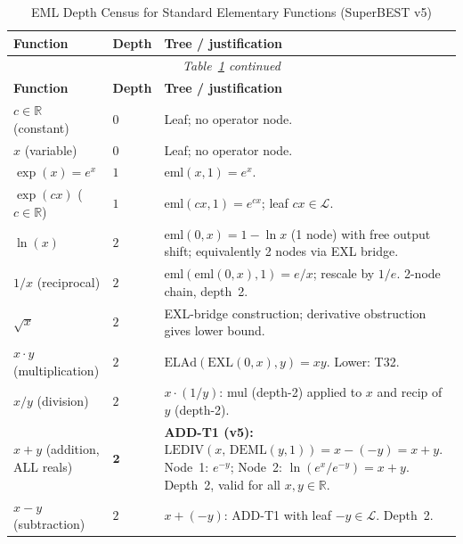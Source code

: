 \documentclass[12pt,a4paper]{article}
\theoremstyle{definition}
\theoremstyle{remark}
\begin{document}
\begin{longtable}{@{}llp{8.5cm}@{}}
\caption{EML Depth Census for Standard Elementary Functions (SuperBEST v5)}\label{tab:census}\\
\toprule
\textbf{Function} & \textbf{Depth} & \textbf{Tree / justification} \\
\midrule
\endfirsthead
\multicolumn{3}{c}{\textit{Table~\ref{tab:census} continued}} \\
\toprule
\textbf{Function} & \textbf{Depth} & \textbf{Tree / justification} \\
\midrule
\endhead
\bottomrule
\endlastfoot

$c \in \mathbb{R}$ (constant)
  & $0$ & Leaf; no operator node. \\[3pt]
$x$ (variable)
  & $0$ & Leaf; no operator node. \\[5pt]

$\exp(x) = e^x$
  & $1$ & $\mathrm{eml}(x,1) = e^x$. \\[2pt]
$\exp(cx)$ ($c \in \mathbb{R}$)
  & $1$ & $\mathrm{eml}(cx,1) = e^{cx}$; leaf $cx \in \mathcal{L}$. \\[5pt]

$\ln(x)$
  & $2$ & $\mathrm{eml}(0,x) = 1-\ln x$ (1 node) with free output shift;
    equivalently 2 nodes via EXL bridge. \\[2pt]
$1/x$ (reciprocal)
  & $2$ & $\mathrm{eml}(\mathrm{eml}(0,x),1) = e/x$; rescale by $1/e$. 2-node chain, depth~2. \\[2pt]
$\sqrt{x}$
  & $2$ & EXL-bridge construction; derivative obstruction gives lower bound. \\[2pt]
$x \cdot y$ (multiplication)
  & $2$ & $\mathrm{ELAd}(\mathrm{EXL}(0,x),y) = xy$. Lower: T32. \\[2pt]
$x/y$ (division)
  & $2$ & $x \cdot (1/y)$: mul (depth-2) applied to $x$ and recip of $y$ (depth-2). \\[2pt]
$x + y$ (addition, ALL reals)
  & $\mathbf{2}$
  & \textbf{ADD-T1 (v5):} $\mathrm{LEDIV}(x,\,\mathrm{DEML}(y,1))
    = x - (-y) = x+y$.
    Node~1: $e^{-y}$; Node~2: $\ln(e^x/e^{-y}) = x+y$.
    Depth~2, valid for all $x, y \in \mathbb{R}$. \\[2pt]
$x - y$ (subtraction)
  & $2$ & $x + (-y)$: ADD-T1 with leaf $-y \in \mathcal{L}$. Depth~2. \\[5pt]


\end{longtable}
\end{document}
